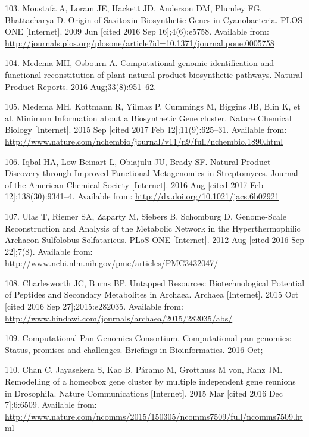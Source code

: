\documentclass[12pt,twoside]{reedthesis}
\begin{document}
{  \hypertarget{ref-moustafa_origin_2009}{}
  103. Moustafa A, Loram JE, Hackett JD, Anderson DM, Plumley FG,
  Bhattacharya D. Origin of Saxitoxin Biosynthetic Genes in Cyanobacteria.
  PLOS ONE {[}Internet{]}. 2009 Jun {[}cited 2016 Sep 16{]};4(6):e5758.
  Available from:
  \url{http://journals.plos.org/plosone/article?id=10.1371/journal.pone.0005758}
  
  \hypertarget{ref-medema_computational_2016}{}
  104. Medema MH, Osbourn A. Computational genomic identification and
  functional reconstitution of plant natural product biosynthetic
  pathways. Natural Product Reports. 2016 Aug;33(8):951--62.
  
  \hypertarget{ref-medema_minimum_2015}{}
  105. Medema MH, Kottmann R, Yilmaz P, Cummings M, Biggins JB, Blin K, et
  al. Minimum Information about a Biosynthetic Gene cluster. Nature
  Chemical Biology {[}Internet{]}. 2015 Sep {[}cited 2017 Feb
  12{]};11(9):625--31. Available from:
  \url{http://www.nature.com/nchembio/journal/v11/n9/full/nchembio.1890.html}
  
  \hypertarget{ref-iqbal_natural_2016}{}
  106. Iqbal HA, Low-Beinart L, Obiajulu JU, Brady SF. Natural Product
  Discovery through Improved Functional Metagenomics in Streptomyces.
  Journal of the American Chemical Society {[}Internet{]}. 2016 Aug
  {[}cited 2017 Feb 12{]};138(30):9341--4. Available from:
  \url{http://dx.doi.org/10.1021/jacs.6b02921}
  
  \hypertarget{ref-ulas_genome-scale_2012}{}
  107. Ulas T, Riemer SA, Zaparty M, Siebers B, Schomburg D. Genome-Scale
  Reconstruction and Analysis of the Metabolic Network in the
  Hyperthermophilic Archaeon Sulfolobus Solfataricus. PLoS ONE
  {[}Internet{]}. 2012 Aug {[}cited 2016 Sep 22{]};7(8). Available from:
  \url{http://www.ncbi.nlm.nih.gov/pmc/articles/PMC3432047/}
  
  \hypertarget{ref-charlesworth_untapped_2015}{}
  108. Charlesworth JC, Burns BP. Untapped Resources: Biotechnological
  Potential of Peptides and Secondary Metabolites in Archaea. Archaea
  {[}Internet{]}. 2015 Oct {[}cited 2016 Sep 27{]};2015:e282035. Available
  from: \url{http://www.hindawi.com/journals/archaea/2015/282035/abs/}
  
  \hypertarget{ref-computational_pan-genomics_consortium_computational_2016}{}
  109. Computational Pan-Genomics Consortium. Computational pan-genomics:
  Status, promises and challenges. Briefings in Bioinformatics. 2016 Oct;
  
  \hypertarget{ref-chan_remodelling_2015}{}
  110. Chan C, Jayasekera S, Kao B, Páramo M, Grotthuss M von, Ranz JM.
  Remodelling of a homeobox gene cluster by multiple independent gene
  reunions in Drosophila. Nature Communications {[}Internet{]}. 2015 Mar
  {[}cited 2016 Dec 7{]};6:6509. Available from:
  \url{http://www.nature.com/ncomms/2015/150305/ncomms7509/full/ncomms7509.html}
  
}
\end{document}
